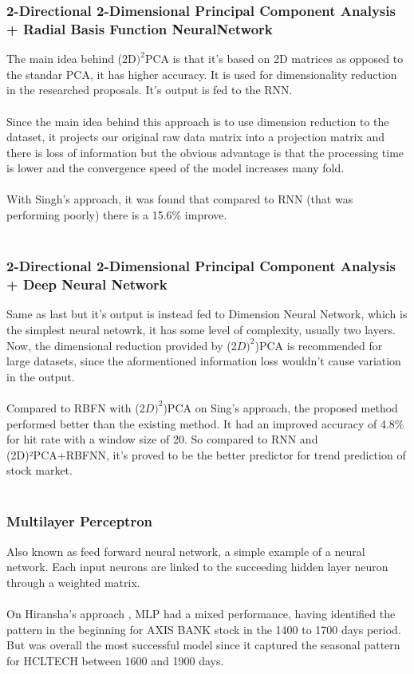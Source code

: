 \documentclass[conference]{IEEEtran}
\begin{document}
\subsubsection{2-Directional 2-Dimensional Principal Component Analysis + Radial Basis Function NeuralNetwork}
The main idea behind (2D$)^2$PCA is that it's based on 2D matrices as opposed to the standar PCA, it has higher accuracy. It is used for dimensionality reduction in
the researched proposals. It's output is fed to the RNN.
\\\\
Since the main idea behind this approach is to use dimension reduction to the dataset, it projects our original raw data matrix into a projection matrix and there is loss of information
but the obvious advantage is that the processing time is lower and the convergence speed of the model increases many fold.
\\\\
With Singh's approach\cite{Singh2016}, it was found that compared to RNN (that was performing poorly) there is a 15.6\% improve. 
\\\\
\subsubsection{2-Directional 2-Dimensional Principal Component Analysis + Deep Neural Network}
Same as last but it's output is instead fed to Dimension Neural Network, which is the simplest neural netowrk, it has some level of complexity, usually two layers. Now, the dimensional reduction provided by 
(2$D)^2$)PCA is recommended for large datasets, since the aformentioned information loss wouldn't cause variation in the output.
\\\\
Compared to RBFN with (2$D)^2$)PCA on Sing's approach\cite{Singh2016}, the proposed method performed better than the existing method. It had an improved accuracy of 4.8\% for hit rate with a window
size of 20. So compared to RNN and (2D)²PCA+RBFNN, it's proved to be the better predictor for trend prediction of stock market.
\\\\
\subsubsection{Multilayer Perceptron}
Also known as feed forward neural network, a simple example of a neural network. Each input neurons are linked to the succeeding hidden layer neuron
through a weighted matrix.
\\\\
On Hiransha's approach \cite{M2018}, MLP had a mixed performance, having identified the pattern in the beginning for AXIS BANK stock in the 1400 to 1700 days period. But was overall the most successful model since it captured the seasonal pattern for HCLTECH between 1600 and 1900 days.
\\\\
\end{document}
